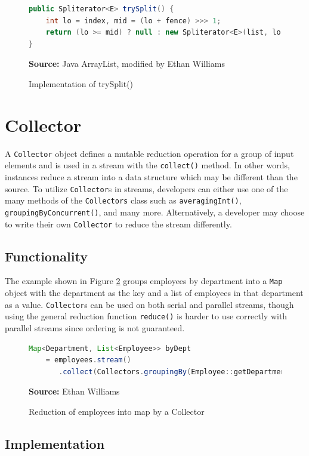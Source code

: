 \documentclass[oneside, 12pt]{article}
\newcommand{\source}[1]{\textbf{Source:} {#1} }
\begin{document}
\begin{figure}[H]
\centering
\begin{lstlisting}[language=Java]
public Spliterator<E> trySplit() {
    int lo = index, mid = (lo + fence) >>> 1;
    return (lo >= mid) ? null : new Spliterator<E>(list, lo, index = mid);
}
\end{lstlisting}
\caption{Implementation of trySplit()}
\source{Java ArrayList, modified by Ethan Williams}
\label{fig:trySplit}
\end{figure}

\section{Collector}
A \verb|Collector| object defines a mutable reduction operation for a group of input elements and is used in a stream with the \verb|collect()| method. In other words, instances reduce a stream into a data structure which may be different than the source. To utilize \verb|Collector|s in streams, developers can either use one of the many methods of the \verb|Collectors| class such as \verb|averagingInt()|, \verb|groupingByConcurrent()|, and many more. Alternatively, a developer may choose to write their own \verb|Collector| to reduce the stream differently.

\subsection{Functionality}
The example shown in Figure \ref{fig:employee_collection} groups employees by department into a \verb|Map| object with the department as the key and a list of employees in that department as a value. \verb|Collector|s can be used on both serial and parallel streams, though using the general reduction function \verb|reduce()| is harder to use correctly with parallel streams since ordering is not guaranteed.

\begin{figure}[H]
\centering
\begin{lstlisting}[language=Java]
Map<Department, List<Employee>> byDept
    = employees.stream()
       .collect(Collectors.groupingBy(Employee::getDepartment));
\end{lstlisting}
\caption{Reduction of employees into map by a Collector}
\source{Ethan Williams}
\label{fig:employee_collection}
\end{figure}

\subsection{Implementation}
\end{document}

